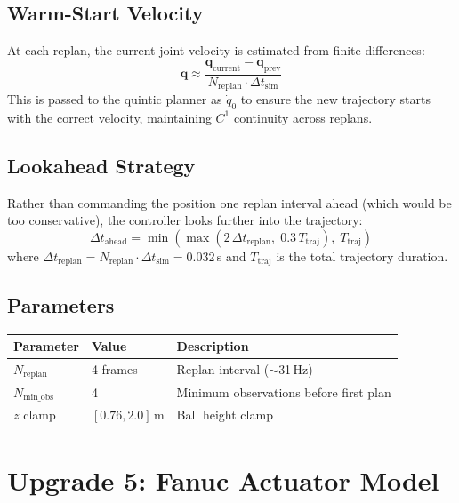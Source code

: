 \documentclass[11pt,letterpaper]{article}
\newcommand{\vv}[1]{\mathbf{#1}}
\begin{document}
\subsection{Warm-Start Velocity}

At each replan, the current joint velocity is estimated from finite differences:
\begin{equation}
    \dot{\vv{q}} \approx \frac{\vv{q}_{\text{current}} - \vv{q}_{\text{prev}}}{N_{\text{replan}} \cdot \Delta t_{\text{sim}}}
\end{equation}
This is passed to the quintic planner as $\dot{q}_0$ to ensure the new trajectory starts with the correct velocity, maintaining $C^1$ continuity across replans.

\subsection{Lookahead Strategy}

Rather than commanding the position one replan interval ahead (which would be too conservative), the controller looks further into the trajectory:
\begin{equation}
    \Delta t_{\text{ahead}} = \min\!\left(\max(2\,\Delta t_{\text{replan}},\; 0.3\,T_{\text{traj}}),\; T_{\text{traj}}\right)
\end{equation}
where $\Delta t_{\text{replan}} = N_{\text{replan}} \cdot \Delta t_{\text{sim}} = 0.032$\,s and $T_{\text{traj}}$ is the total trajectory duration.

\subsection{Parameters}

\begin{table}[H]
\centering\small
\begin{tabular}{@{}lll@{}}
\toprule
Parameter & Value & Description \\
\midrule
$N_{\text{replan}}$ & 4 frames & Replan interval ($\sim$31\,Hz) \\
$N_{\text{min\_obs}}$ & 4 & Minimum observations before first plan \\
$z$ clamp & $[0.76, 2.0]$\,m & Ball height clamp \\
\bottomrule
\end{tabular}
\end{table}

\section{Upgrade 5: Fanuc Actuator Model}
\label{sec:actuator}
\end{document}
